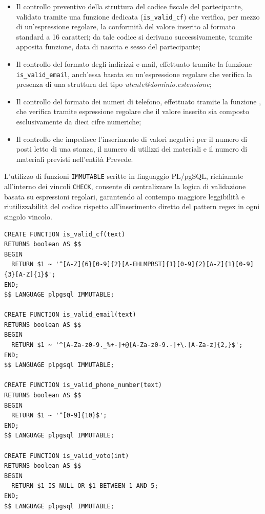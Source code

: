 \documentclass[11pt,a4paper]{article}
\begin{document}
\begin{itemize}[nosep]
  \item Il controllo preventivo della struttura del codice fiscale del partecipante, validato
    tramite una funzione dedicata (\texttt{is\_valid\_cf}) che verifica, per mezzo di
    un'espressione regolare, la conformità del valore inserito al formato standard a 16
    caratteri; da tale codice si derivano successivamente, tramite apposita funzione, data di
    nascita e sesso del partecipante;
  \item Il controllo del formato degli indirizzi e-mail, effettuato tramite la funzione
    \texttt{is\_valid\_email}, anch'essa basata su un'espressione regolare che verifica la
    presenza di una struttura del tipo \textit{utente@dominio.estensione};
  \item Il controllo del formato dei numeri di telefono, effettuato tramite la funzione
    , che verifica tramite espressione regolare che il valore
    inserito sia composto esclusivamente da dieci cifre numeriche;
  \item Il controllo che impedisce l'inserimento di valori negativi per il numero di posti letto
    di una stanza, il numero di utilizzi dei materiali e il numero di materiali previsti
    nell'entità Prevede.
\end{itemize}

L'utilizzo di funzioni \texttt{IMMUTABLE} scritte in linguaggio PL/pgSQL, richiamate all'interno
dei vincoli \texttt{CHECK}, consente di centralizzare la logica di validazione basata su
espressioni regolari, garantendo al contempo maggiore leggibilità e riutilizzabilità del codice
rispetto all'inserimento diretto del pattern regex in ogni singolo vincolo.

\begin{verbatim}
CREATE FUNCTION is_valid_cf(text)
RETURNS boolean AS $$
BEGIN
  RETURN $1 ~ '^[A-Z]{6}[0-9]{2}[A-EHLMPRST]{1}[0-9]{2}[A-Z]{1}[0-9]{3}[A-Z]{1}$';
END;
$$ LANGUAGE plpgsql IMMUTABLE;

CREATE FUNCTION is_valid_email(text)
RETURNS boolean AS $$
BEGIN
  RETURN $1 ~ '^[A-Za-z0-9._%+-]+@[A-Za-z0-9.-]+\.[A-Za-z]{2,}$';
END;
$$ LANGUAGE plpgsql IMMUTABLE;

CREATE FUNCTION is_valid_phone_number(text)
RETURNS boolean AS $$
BEGIN
  RETURN $1 ~ '^[0-9]{10}$';
END;
$$ LANGUAGE plpgsql IMMUTABLE;

CREATE FUNCTION is_valid_voto(int)
RETURNS boolean AS $$
BEGIN
  RETURN $1 IS NULL OR $1 BETWEEN 1 AND 5;
END;
$$ LANGUAGE plpgsql IMMUTABLE;
\end{verbatim}
\end{document}
